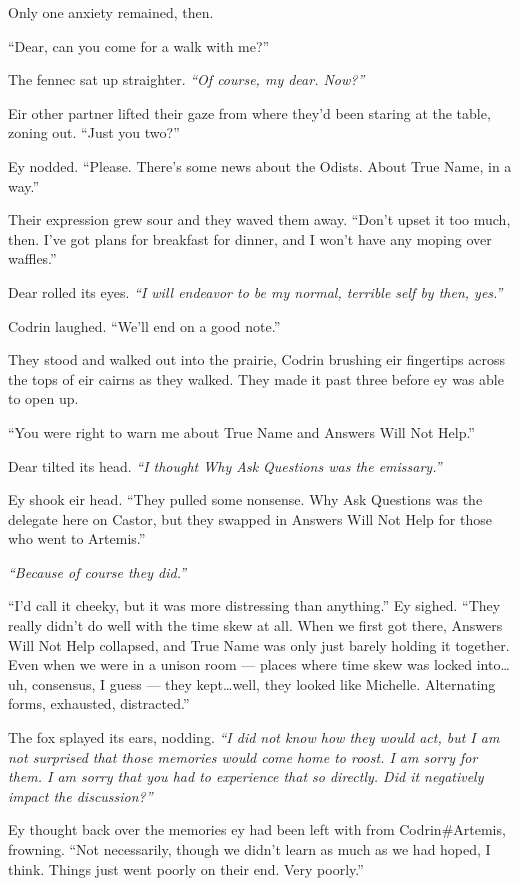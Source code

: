 Only one anxiety remained, then.

``Dear, can you come for a walk with me?''

The fennec sat up straighter. \emph{``Of course, my dear. Now?''}

Eir other partner lifted their gaze from where they'd been staring at the table, zoning out. ``Just you two?''

Ey nodded. ``Please. There's some news about the Odists. About True Name, in a way.''

Their expression grew sour and they waved them away. ``Don't upset it too much, then. I've got plans for breakfast for dinner, and I won't have any moping over waffles.''

Dear rolled its eyes. \emph{``I will endeavor to be my normal, terrible self by then, yes.''}

Codrin laughed. ``We'll end on a good note.''

They stood and walked out into the prairie, Codrin brushing eir fingertips across the tops of eir cairns as they walked. They made it past three before ey was able to open up.

``You were right to warn me about True Name and Answers Will Not Help.''

Dear tilted its head. \emph{``I thought Why Ask Questions was the emissary.''}

Ey shook eir head. ``They pulled some nonsense. Why Ask Questions was the delegate here on Castor, but they swapped in Answers Will Not Help for those who went to Artemis.''

\emph{``Because of course they did.''}

``I'd call it cheeky, but it was more distressing than anything.'' Ey sighed. ``They really didn't do well with the time skew at all. When we first got there, Answers Will Not Help collapsed, and True Name was only just barely holding it together. Even when we were in a unison room — places where time skew was locked into\ldots uh, consensus, I guess — they kept\ldots well, they looked like Michelle. Alternating forms, exhausted, distracted.''

The fox splayed its ears, nodding. \emph{``I did not know how they would act, but I am not surprised that those memories would come home to roost. I am sorry for them. I am sorry that you had to experience that so directly. Did it negatively impact the discussion?''}

Ey thought back over the memories ey had been left with from Codrin\#Artemis, frowning. ``Not necessarily, though we didn't learn as much as we had hoped, I think. Things just went poorly on their end. Very poorly.''


